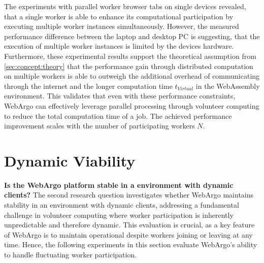 The experiments with parallel worker browser tabs on single devices revealed, that a single worker is able to enhance its computational participation by executing multiple worker instances simultaneously. However, the measured performance difference between the laptop and desktop \ac{PC} is suggesting, that the execution of multiple worker instances is limited by the devices hardware.
~\\
Furthermore, these experimental results support the theoretical assumption from \autoref{sec:concept:theory} that the performance gain through distributed computation on multiple workers is able to outweigh the additional overhead of communicating through the internet and the longer computation time $t_{Virtual}$ in the WebAssembly environment. This validates that even with these performance constraints, WebArgo can effectively leverage parallel processing through volunteer computing to reduce the total computation time of a job. The achieved performance improvement scales with the number of participating workers $N$.

\section{Dynamic Viability}
\label{sec:evaluation:dynamic}
\textbf{Is the WebArgo platform stable in a environment with dynamic clients?}
\newline
The second research question investigates whether WebArgo maintains stability in an environment with dynamic clients, addressing a fundamental challenge in volunteer computing where worker participation is inherently unpredictable and therefore dynamic. This evaluation is crucial, as a key feature of WebArgo is to maintain operational despite workers joining or leaving at any time. Hence, the following experiments in this section evaluate WebArgo's ability to handle fluctuating worker participation.

